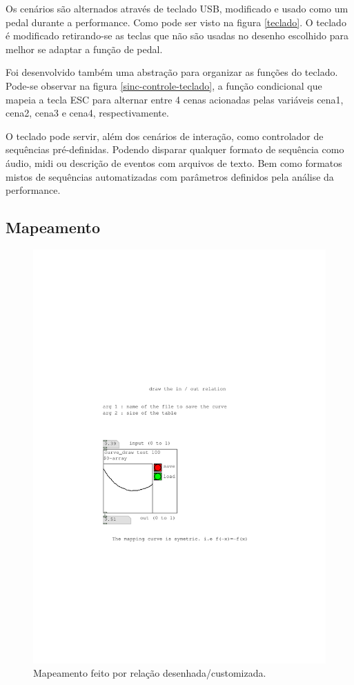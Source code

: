 \documentclass{ppgmus}
\begin{document}
Os cenários são alternados através de teclado USB, modificado e usado como
um pedal durante a performance. Como pode ser visto na figura \ref{teclado}.
O teclado é modificado retirando-se as teclas que não são usadas no desenho escolhido
para melhor se adaptar a função de pedal.

Foi desenvolvido também uma abstração para organizar as funções do teclado.
Pode-se observar na figura \ref{sinc-controle-teclado}, a função condicional
que mapeia a tecla ESC para alternar entre 4 cenas acionadas pelas variáveis
cena1, cena2, cena3 e cena4, respectivamente.

O teclado pode servir, além dos cenários de interação, como controlador
de sequências pré-definidas. Podendo disparar qualquer formato de sequência como
áudio, midi ou descrição de eventos com arquivos de texto. Bem como formatos mistos
de sequências automatizadas com parâmetros definidos pela análise da performance.


\subsection{Mapeamento}


\begin{figure}
\includegraphics[scale=.6]{mapping1}
\caption{Mapeamento feito por relação desenhada/customizada.}
\label{mapping1}
\end{figure}
\end{document}
